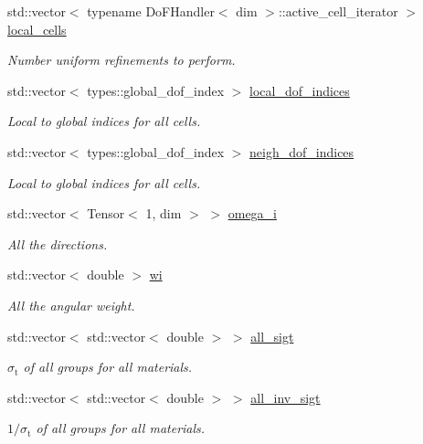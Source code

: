 \begin{DoxyCompactItemize}
\item 
std\+::vector$<$ typename Do\+F\+Handler$<$ dim $>$\+::active\+\_\+cell\+\_\+iterator $>$ \hyperlink{class_equation_base_a60d687f69ae6fd56881c15435e91e4e5}{local\+\_\+cells}
\begin{DoxyCompactList}\small\item\em Number uniform refinements to perform. \end{DoxyCompactList}\item 
std\+::vector$<$ types\+::global\+\_\+dof\+\_\+index $>$ \hyperlink{class_equation_base_a63c4e27465bea3cf4c2348ea7f4782c8}{local\+\_\+dof\+\_\+indices}
\begin{DoxyCompactList}\small\item\em Local to global indices for all cells. \end{DoxyCompactList}\item 
std\+::vector$<$ types\+::global\+\_\+dof\+\_\+index $>$ \hyperlink{class_equation_base_a94114d6debfbf1955c3c39f5330ac3c2}{neigh\+\_\+dof\+\_\+indices}
\begin{DoxyCompactList}\small\item\em Local to global indices for all cells. \end{DoxyCompactList}\item 
std\+::vector$<$ Tensor$<$ 1, dim $>$ $>$ \hyperlink{class_equation_base_a46320b14358dd65c8450bba919c856d0}{omega\+\_\+i}
\begin{DoxyCompactList}\small\item\em All the directions. \end{DoxyCompactList}\item 
std\+::vector$<$ double $>$ \hyperlink{class_equation_base_a46388ad4bea156033fa98fd8f484a068}{wi}
\begin{DoxyCompactList}\small\item\em All the angular weight. \end{DoxyCompactList}\item 
std\+::vector$<$ std\+::vector$<$ double $>$ $>$ \hyperlink{class_equation_base_a818488c38892b44ccf25eb6f61e89ecc}{all\+\_\+sigt}
\begin{DoxyCompactList}\small\item\em $\sigma_\mathrm{t}$ of all groups for all materials. \end{DoxyCompactList}\item 
std\+::vector$<$ std\+::vector$<$ double $>$ $>$ \hyperlink{class_equation_base_aedead29f1c4bb6b9f7b17b1fe1441c5f}{all\+\_\+inv\+\_\+sigt}
\begin{DoxyCompactList}\small\item\em $1/\sigma_\mathrm{t}$ of all groups for all materials. \end{DoxyCompactList}\item 

\end{DoxyCompactItemize}
